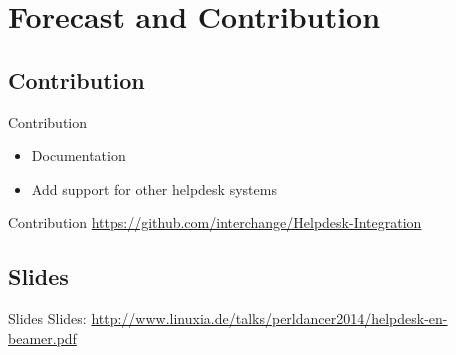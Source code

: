 \section{Forecast and Contribution}

\subsection{Contribution}
\begin{frame}{Contribution}
\begin{itemize}
\item Documentation
\item Add support for other helpdesk systems
\end{itemize}
\end{frame}

\begin{frame}{Contribution}
\url{https://github.com/interchange/Helpdesk-Integration}
\end{frame}

\subsection{Slides}

\begin{frame}{Slides}
Slides:
\url{http://www.linuxia.de/talks/perldancer2014/helpdesk-en-beamer.pdf}
\end{frame}



